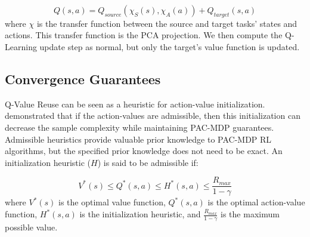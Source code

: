 \documentclass[10pt,a4paper]{article}
\begin{document}
\begin{equation}
Q(s,a) = Q_{source}(\chi_S(s), \chi_A(a)) + Q_{target}(s,a)
\end{equation}
where $\chi$ is the transfer function between the source and target tasks' states and actions. This transfer function is the PCA projection. We then compute the Q-Learning update step as normal, but only the target's value function is updated. 

\subsection{Convergence Guarantees}



Q-Value Reuse can be seen as a heuristic for action-value initialization. \citeauthor{Strehl:2009:RLF:1577069.1755867}  demonstrated that if the action-values are admissible, then this initialization can decrease the sample complexity while maintaining PAC-MDP guarantees. Admissible heuristics provide valuable prior knowledge to PAC-MDP RL algorithms, but the specified prior knowledge does not need to be exact. An initialization heuristic ($H$) is said to be admissible if:

\begin{equation}
V^*(s) \leq Q^*(s,a) \leq H^*(s,a) \leq \frac{R_{max}}{1-\gamma}
\end{equation}
where $V^*(s)$ is the optimal value function, $Q^*(s,a)$ is the optimal action-value function, $H^*(s,a)$ is the initialization heuristic, and $\frac{R_{max}}{1-\gamma}$ is the maximum possible value. 
\end{document}
